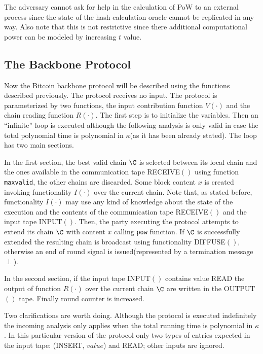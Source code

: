 \documentclass[..]{subfiles}
\begin{document}
\begin{remark}
	\normalfont
	The adversary cannot ask for help in the calculation of PoW to an external process since the state of the hash calculation oracle cannot be replicated in any way. Also note that this is not restrictive since there additional computational power can be modeled by increasing $t$ value.
\end{remark} 




\subsection{The Backbone Protocol}

Now the Bitcoin backbone protocol will be described using the functions described previously. The protocol receives no input. The protocol is parameterized by two functions, the input contribution function $V(\cdot)$ and the chain reading function $R(\cdot)$. The first step is to initialize the variables. Then an ``infinite'' loop is executed although the following analysis is only valid in case the total polynomial time is polynomial in $\kappa$(as it has been already stated). The loop has two main sections.

In the first section, the best valid chain $\C$ is selected between its local chain and the ones available in the communication tape RECEIVE$()$ using function \texttt{maxvalid}, the other chains are discarded. Some block content $x$ is created invoking functionality $I(\cdot)$ over the current chain. Note that, as stated before, functionality $I(\cdot)$ may use any kind of knowledge about the state of the execution and the contents of the communication tape RECEIVE$()$ and the input tape INPUT$()$. Then, the party executing the protocol attempts to extend its chain $\C$ with content $x$ calling \texttt{pow} function. If $\C$ is successfully extended the resulting chain is broadcast using functionality DIFFUSE$()$, otherwise an end of round signal is issued(represented by a termination message $\perp$).

In the second section, if the input tape INPUT$()$ contains value READ the output of function $R(\cdot)$ over the current chain $\C$ are written in the OUTPUT$()$ tape. Finally round counter is increased.

Two clarifications are worth doing. Although the protocol is executed indefinitely the incoming analysis only applies when the total running time is polynomial in $\kappa$. In this particular version of the protocol only two types of entries expected in the input tape: (INSERT, $value$) and READ; other inputs are ignored.
\end{document}
